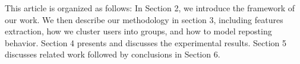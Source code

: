 This article is organized as follows: In Section 2, we introduce the framework of our work. We then describe our methodology in section 3, including features extraction, how we cluster users into groups, and how to model reposting behavior. Section 4 presents and discusses the experimental results. Section 5 discusses related work followed by conclusions in Section 6.\par

